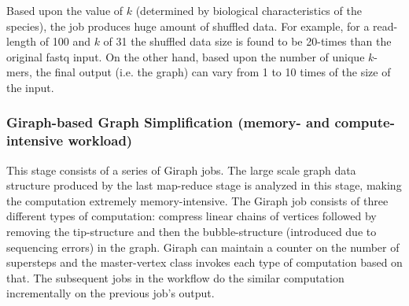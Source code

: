 \documentclass[conference]{IEEEtran}
\begin{document}
Based upon the value of $k$ (determined by biological characteristics of the species), the job produces huge amount of shuffled data. 
For example, for a read-length of 100 and $k$ of 31 the shuffled data size is found to be 20-times than the original fastq input. 
On the other hand, based upon the number of unique $k$-mers, the final output (i.e. the graph) can vary from 1 to 10 times of the size of the input. 

\subsubsection {Giraph-based Graph Simplification (memory- and compute-intensive workload)}
This stage consists of a series of Giraph jobs. 
The large scale graph data structure produced by the last map-reduce stage is analyzed in this stage, making the computation extremely memory-intensive. 
The Giraph job consists of three different types of computation: compress linear chains of vertices followed by removing the tip-structure and then the bubble-structure (introduced due to sequencing errors) in the graph. 
Giraph can maintain a counter on the number of supersteps and the master-vertex class invokes each type of computation based on that. 
The subsequent jobs in the workflow do the similar computation incrementally on the previous job's output. 
\end{document}
